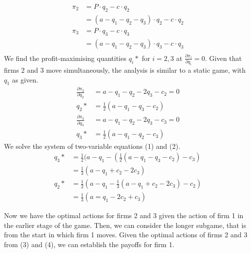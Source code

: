 \documentclass[10pt,a4paper]{article}
\begin{document}
\begin{align*}
	\pi_2 &= P \cdot q_2 - c \cdot q_2 \\
	&= (a - q_1 - q_2 - q_3) \cdot q_2 - c \cdot q_2 \\
	\pi_3 &= P \cdot q_3 - c \cdot q_3 \\
	&= (a - q_1 - q_2 - q_3) \cdot q_3 - c \cdot q_3 \\
\end{align*}
We find the profit-maximising quantities $q_i*$ for $i=2,3$ at $\frac{\partial \pi_i}{\partial q_i} = 0$. Given that firms 2 and 3 move simultaneously, the analysis is similar to a static game, with $q_1$ as given.
\begin{align*}
	\frac{\partial \pi_2}{\partial q_2} &= a - q_1 - q_2 - 2q_3 - c_2 = 0 \\
 	q_2* &= \frac{1}{2} (a - q_1 - q_3 - c_2)  \\
	\frac{\partial \pi_3}{\partial q_3} &= a - q_1 - q_2 - 2q_3 - c_3 = 0 \\
 	q_3* &= \frac{1}{2} (a- q_1 - q_2 -c_3)  
\end{align*}
We solve the system of two-variable equations (1) and (2).
\begin{align*}
	q_3* &= \frac{1}{2} (a - q_1 - (\frac{1}{2} (a - q_1 - q_3 - c_2) - c_3) \\
	&= \frac{1}{3} (a - q_1 + c_2 - 2c_3) \\
	q_2* &= \frac{1}{2} (a - q_1 - \frac{1}{3} (a - q_1 + c_2 - 2c_3) - c_2) \\
	&= \frac{1}{3} (a = q_1 - 2c_2 + c_3)
\end{align*}

Now we have the optimal actions for firms 2 and 3 given the action of firm 1 in the earlier stage of the game. Then, we  can consider the longer subgame, that is from the start in which firm 1 moves. Given the optimal actions of firms 2 and 3 from (3) and (4), we can establish the payoffs for firm 1.
\end{document}
